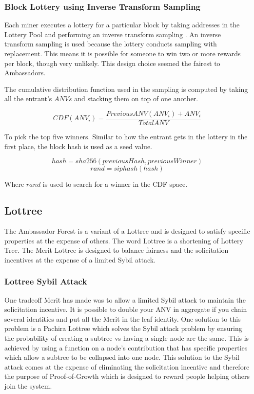 \documentclass{article}
\begin{document}
\subsubsection{Block Lottery using Inverse Transform Sampling}

Each miner executes a lottery for a particular block by taking addresses in
the Lottery Pool and performing an inverse transform sampling \cite{inverse}.
An inverse transform sampling is used because the lottery conducts sampling
with replacement. This means it is possible for someone to win two or more
rewards per block, though very unlikely. This design choice seemed the fairest to
Ambassadors.

The cumulative distribution function used in the sampling is computed by taking
all the entrant's $ANVs$ and stacking them on top of one another.

$$CDF(ANV_i) = \frac{PreviousANV(ANV_i) + ANV_i}{TotalANV}$$

To pick the top five winners. Similar to how the entrant gets in the lottery in the
first place, the block hash is used as a seed value.

$$hash = sha256(previousHash, previousWinner)$$
$$rand = siphash(hash)$$

Where $rand$ is used to search for a winner in the CDF space.

\subsection{Lottree}

The Ambassador Forest is a variant of a Lottree \cite{lottree} and is designed
to satisfy specific properties at the expense of others. The word Lottree is a
shortening of Lottery Tree. The Merit Lottree is designed to balance fairness and
the solicitation incentives at the expense of a limited Sybil attack.

\subsubsection{Lottree Sybil Attack}

One tradeoff Merit has made was to allow a limited Sybil attack to maintain the
solicitation incentive. It is possible to double your ANV in aggregate if you
chain several identities and put all the Merit in the leaf identity. One
solution to this problem is a Pachira Lottree \cite{lottree} which solves the
Sybil attack problem by ensuring the probability of creating a subtree vs having
a single node are the same. This is achieved by using a function on a node's
contribution that has specific properties which allow a subtree to be collapsed
into one node. This solution to the Sybil attack comes at the expense of
eliminating the solicitation incentive and therefore the purpose of Proof-of-Growth
which is designed to reward people helping others join the system. 
\end{document}
